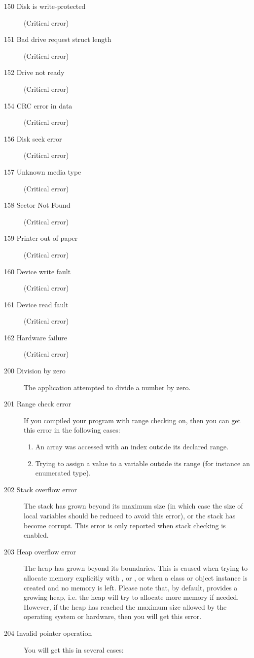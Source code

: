 \begin{description}
\item [150  Disk is write-protected]
(Critical error)
\item [151  Bad drive request struct length]
(Critical error)
\item [152  Drive not ready]
(Critical error)
\item [154  CRC error in data]
(Critical error)
\item [156  Disk seek error]
(Critical error)
\item [157  Unknown media type]
(Critical error)
\item [158  Sector Not Found]
(Critical error)
\item [159  Printer out of paper]
(Critical error)
\item [160  Device write fault]
(Critical error)
\item [161  Device read fault]
(Critical error)
\item [162  Hardware failure]
(Critical error)
\item [200  Division by zero]
The application attempted to divide a number by zero.
\item [201  Range check error]
If you compiled your program with range checking on, then you can get this
error in the following cases:
\begin{enumerate}
\item An array was accessed with an index outside its declared range.
\item Trying to assign a value to a variable outside its range (for
instance an enumerated type).
\end{enumerate}
\item [202  Stack overflow error]
The stack has grown beyond its maximum size (in which case the size of
local variables should be reduced to avoid this error), or the stack has
become corrupt. This error is only reported when stack checking is enabled.
\item [203  Heap overflow error]
The heap has grown beyond its boundaries. This is caused when trying to allocate
memory explicitly with ,  or , or when
a class or object instance is created and no memory is left. Please note
that, by default, \fpc provides a growing heap, i.e. the heap will
try to allocate more memory if needed. However, if the heap has reached the
maximum size allowed by the operating system or hardware, then you will get
this error.
\item [204  Invalid pointer operation]
You will get this in several cases:
\begin{itemize}

\end{itemize}
\end{description}
